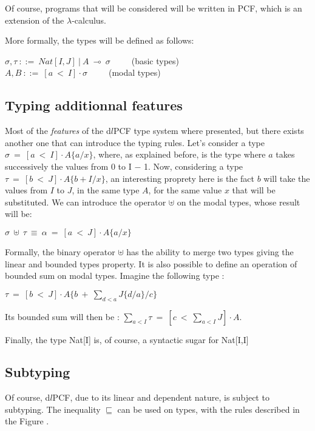 \documentclass[a4paper,12pt]{article}
\begin{document}
Of course, programs that will be considered will be written in PCF, which is an
extension of the $\lambda$-calculus. 

More formally, the types will be defined as follows:

\begin{center}
  $\sigma, \tau~::=~Nat[I,J]~|~A~\multimap~\sigma$~~~~~(basic types) \\
  $A, B~::=~[a~<~I] \cdot \sigma$~~~~~(modal types)
\end{center}

\subsection{Typing additionnal features}


Most of the \emph{features} of the d$l$PCF type system where presented, but
there exists another one that can introduce the typing rules. Let's consider a
type $\sigma~=~[a~<~I] \cdot A\{a/x\}$, where, as explained before, is the type
where $a$ takes successively the values from 0 to I $-$ 1. Now, considering a
type $\tau~=~[b~<~J] \cdot A\{b+I/x\}$, an interesting proprety here is the fact
$b$ will take the values from $I$ to $J$, in the same type $A$, for the same value
$x$ that will be substituted. We can introduce the operator $\uplus$ on the
modal types, whose result will be:

\begin{center}
$\sigma~\uplus~\tau~\equiv~\alpha~=~[a~<~J] \cdot A\{a/x\}$
\end{center}

Formally, the binary operator $\uplus$ has the ability to merge two types giving
the linear and bounded types property. It is also possible to define an
operation of bounded sum on modal types. Imagine the following type :

\begin{center}
  $\tau~=~[b~<~J] \cdot A\{b~+~\sum_{d<a}J\{d/a\}/c\}$
\end{center}

Its bounded sum will then be : $\sum_{a<I} \tau ~=~ [c~<~\sum_{a<I}J] \cdot A$. 

Finally, the type Nat[I] is, of course, a syntactic sugar for Nat[I,I]

\subsection{Subtyping}

Of course, d$l$PCF, due to its linear and dependent nature, is subject to
subtyping. The inequality $\sqsubseteq$ can be used on types, with the rules
described in the Figure \label{subtyping}.
\end{document}
